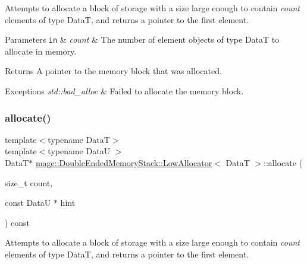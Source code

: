 Attempts to allocate a block of storage with a size large enough to contain {\itshape count} elements of type {\ttfamily DataT}, and returns a pointer to the first element.


\begin{DoxyParams}[1]{Parameters}
\mbox{\tt in}  & {\em count} & The number of element objects of type {\ttfamily DataT} to allocate in memory. \\
\hline
\end{DoxyParams}
\begin{DoxyReturn}{Returns}
A pointer to the memory block that was allocated. 
\end{DoxyReturn}

\begin{DoxyExceptions}{Exceptions}
{\em std\+::bad\+\_\+alloc} & Failed to allocate the memory block. \\
\hline
\end{DoxyExceptions}
\hypertarget{structmage_1_1_double_ended_memory_stack_1_1_low_allocator_a799bd33b5a3453be2243baf0769b5826}{}\label{structmage_1_1_double_ended_memory_stack_1_1_low_allocator_a799bd33b5a3453be2243baf0769b5826} 
\subsubsection{\texorpdfstring{allocate()}{allocate()}\hspace{0.1cm}{\footnotesize\ttfamily [2/2]}}
{\footnotesize\ttfamily template$<$typename DataT$>$ \\
template$<$typename DataU $>$ \\
DataT$\ast$ \hyperlink{structmage_1_1_double_ended_memory_stack_1_1_low_allocator}{mage\+::\+Double\+Ended\+Memory\+Stack\+::\+Low\+Allocator}$<$ DataT $>$\+::allocate (\begin{DoxyParamCaption}\item[{size\+\_\+t}]{count,  }\item[{const DataU $\ast$}]{hint }\end{DoxyParamCaption}) const}

Attempts to allocate a block of storage with a size large enough to contain {\itshape count} elements of type {\ttfamily DataT}, and returns a pointer to the first element.


